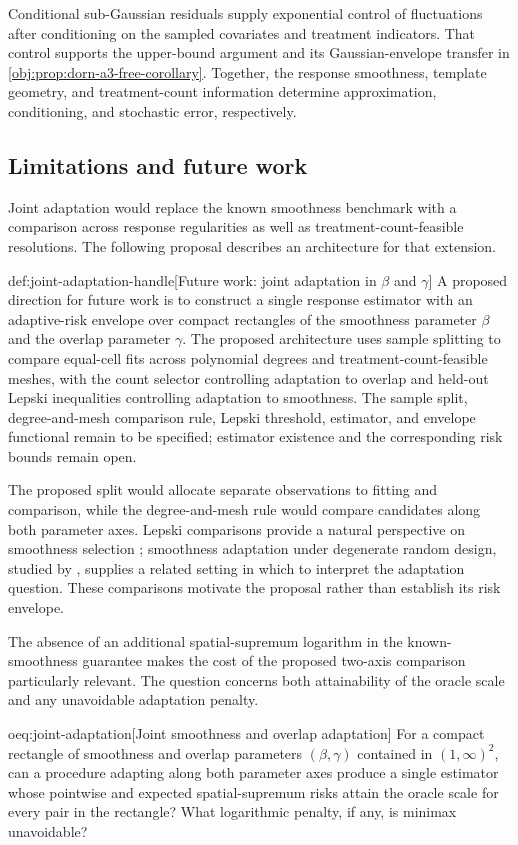 \documentclass[11pt]{article}
\begin{document}
Conditional sub-Gaussian residuals supply exponential control of fluctuations after conditioning on the sampled covariates and treatment indicators. That control supports the upper-bound argument and its Gaussian-envelope transfer in \cref{obj:prop:dorn-a3-free-corollary}. Together, the response smoothness, template geometry, and treatment-count information determine approximation, conditioning, and stochastic error, respectively.

\subsection{Limitations and future work}

Joint adaptation would replace the known smoothness benchmark with a comparison across response regularities as well as treatment-count-feasible resolutions. The following proposal describes an architecture for that extension.
\begin{remarkv}{def:joint-adaptation-handle}[Future work: joint adaptation in $\beta$ and $\gamma$]
A proposed direction for future work is to construct a single response estimator with an adaptive-risk envelope over compact rectangles of the smoothness parameter \(\beta\) and the overlap parameter \(\gamma\). The proposed architecture uses sample splitting to compare equal-cell fits across polynomial degrees and treatment-count-feasible meshes, with the count selector controlling adaptation to overlap and held-out Lepski inequalities controlling adaptation to smoothness. The sample split, degree-and-mesh comparison rule, Lepski threshold, estimator, and envelope functional remain to be specified; estimator existence and the corresponding risk bounds remain open.
\end{remarkv}

The proposed split would allocate separate observations to fitting and comparison, while the degree-and-mesh rule would compare candidates along both parameter axes. Lepski comparisons provide a natural perspective on smoothness selection \citep{lepski1997}; smoothness adaptation under degenerate random design, studied by \citet{Gaiffas2005AdaptiveDegenerateDesign}, supplies a related setting in which to interpret the adaptation question. These comparisons motivate the proposal rather than establish its risk envelope.

The absence of an additional spatial-supremum logarithm in the known-smoothness guarantee makes the cost of the proposed two-axis comparison particularly relevant. The question concerns both attainability of the oracle scale and any unavoidable adaptation penalty.
\begin{remarkv}{oeq:joint-adaptation}[Joint smoothness and overlap adaptation]
For a compact rectangle of smoothness and overlap parameters \((\beta,\gamma)\) contained in \((1,\infty)^2\), can a procedure adapting along both parameter axes produce a single estimator whose pointwise and expected spatial-supremum risks attain the oracle scale for every pair in the rectangle? What logarithmic penalty, if any, is minimax unavoidable?
\end{remarkv}
\end{document}
